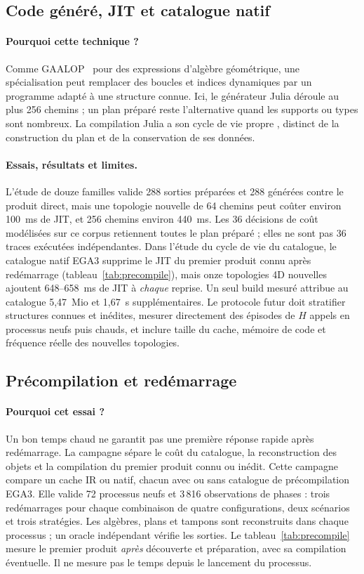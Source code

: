 \documentclass[11pt,a4paper]{article}
\begin{document}
\subsection{Code généré, JIT et catalogue natif}
\paragraph{Pourquoi cette technique ?}
Comme GAALOP~\cite{gaalop} pour des expressions d'algèbre géométrique, une
spécialisation peut remplacer des boucles et indices dynamiques par un
programme adapté à une structure connue. Ici, le générateur Julia déroule
au plus 256 chemins ; un plan préparé reste l'alternative quand les supports
ou types sont nombreux. La compilation Julia a son cycle de vie propre
\cite{juliaprecompile}, distinct de la construction du plan et de la
conservation de ses données.
\paragraph{Essais, résultats et limites.}
L'étude de douze familles valide 288 sorties préparées et 288 générées
contre le produit direct, mais une topologie nouvelle de 64 chemins peut
coûter environ 100~ms de JIT, et 256 chemins environ 440~ms. Les 36
décisions de coût modélisées sur ce corpus retiennent toutes le plan préparé ;
elles ne sont pas 36 traces exécutées indépendantes. Dans l'étude du
cycle de vie du catalogue, le
catalogue natif EGA3 supprime le JIT du premier produit connu après
redémarrage (tableau~\ref{tab:precompile}), mais onze topologies 4D nouvelles
ajoutent 648--658~ms de JIT à \emph{chaque} reprise. Un seul build mesuré
attribue au catalogue 5,47~Mio et 1,67~s supplémentaires. Le protocole
futur doit stratifier structures connues et inédites, mesurer directement
des épisodes de $H$ appels en processus neufs puis chauds, et inclure taille
du cache, mémoire de code et fréquence réelle des nouvelles topologies.

\subsection{Précompilation et redémarrage}
\paragraph{Pourquoi cet essai ?}
Un bon temps chaud ne garantit pas une première réponse rapide après
redémarrage. La campagne sépare le coût du catalogue, la reconstruction
des objets et la compilation du premier produit connu ou inédit.
Cette campagne compare un cache IR ou natif, chacun avec ou sans catalogue
de précompilation EGA3. Elle valide 72 processus neufs et 3\,816 observations
de phases : trois redémarrages pour chaque combinaison de quatre configurations,
deux scénarios et trois stratégies. Les algèbres, plans et tampons sont
reconstruits dans chaque processus ; un oracle indépendant vérifie les sorties.
Le tableau~\ref{tab:precompile} mesure le premier produit \emph{après}
découverte et préparation, avec sa compilation éventuelle. Il ne mesure pas
le temps depuis le lancement du processus.
\end{document}
